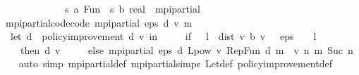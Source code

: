\begin{isabellebody}
\ \ \ \ \ \ \ \ \ \ \ \ {\isasymRightarrow}\ {\isacharparenleft}{\kern0pt}{\isacharprime}{\kern0pt}s{\isacharcomma}{\kern0pt}\ {\isacharprime}{\kern0pt}a{\isacharparenright}{\kern0pt}\ Fun\ {\isasymtimes}\ {\isacharparenleft}{\kern0pt}{\isacharprime}{\kern0pt}s\ {\isasymRightarrow}\isactrlsub b\ real{\isacharparenright}{\kern0pt}{\isachardoublequoteclose}\ \ mpi{\isacharunderscore}{\kern0pt}partial%
\isadelimproof
%
\endisadelimproof
%
\isatagproof
\isacommand{{\isachardot}{\kern0pt}}\isamarkupfalse%
%
\endisatagproof
{\isafoldproof}%
%
\isadelimproof
%
\endisadelimproof
\isanewline
\isanewline
{}\isamarkupfalse%
\ mpi{\isacharunderscore}{\kern0pt}partial{\isacharprime}{\kern0pt}{\isacharunderscore}{\kern0pt}code{\isacharbrackleft}{\kern0pt}code{\isacharbrackright}{\kern0pt}{\isacharcolon}{\kern0pt}\ {\isachardoublequoteopen}mpi{\isacharunderscore}{\kern0pt}partial{\isacharprime}{\kern0pt}\ eps\ d\ v\ m\ {\isacharequal}{\kern0pt}\isanewline
\ \ {\isacharparenleft}{\kern0pt}let\ d{\isacharprime}{\kern0pt}\ {\isacharequal}{\kern0pt}\ policy{\isacharunderscore}{\kern0pt}improvement{\isacharprime}{\kern0pt}\ d\ v\ in\ {\isacharparenleft}{\kern0pt}\isanewline
\ \ \ \ if\ {}\ {\isacharasterisk}{\kern0pt}\ l\ {\isacharasterisk}{\kern0pt}\ dist\ v\ {\isacharparenleft}{\kern0pt}{\isasymL}\isactrlsub b\ v{\isacharparenright}{\kern0pt}\ {\isacharless}{\kern0pt}\ \ eps\ {\isacharasterisk}{\kern0pt}\ {\isacharparenleft}{\kern0pt}{}\ {\isacharminus}{\kern0pt}\ l{\isacharparenright}{\kern0pt}\isanewline
\ \ \ \ then\ {\isacharparenleft}{\kern0pt}d{\isacharprime}{\kern0pt}{\isacharcomma}{\kern0pt}\ v{\isacharparenright}{\kern0pt}\ \isanewline
\ \ \ \ else\ mpi{\isacharunderscore}{\kern0pt}partial{\isacharprime}{\kern0pt}\ eps\ d{\isacharprime}{\kern0pt}\ {\isacharparenleft}{\kern0pt}L{\isacharunderscore}{\kern0pt}pow\ v\ {\isacharparenleft}{\kern0pt}Rep{\isacharunderscore}{\kern0pt}Fun\ d{\isacharprime}{\kern0pt}{\isacharparenright}{\kern0pt}\ {\isacharparenleft}{\kern0pt}m\ {}\ v{\isacharparenright}{\kern0pt}{\isacharparenright}{\kern0pt}\ {\isacharparenleft}{\kern0pt}{\isasymlambda}n{\isachardot}{\kern0pt}\ m\ {\isacharparenleft}{\kern0pt}Suc\ n{\isacharparenright}{\kern0pt}{\isacharparenright}{\kern0pt}{\isacharparenright}{\kern0pt}{\isacharparenright}{\kern0pt}{\isachardoublequoteclose}\isanewline
%
\isadelimproof
\ \ %
\endisadelimproof
%
\isatagproof
{}\isamarkupfalse%
\ {\isacharparenleft}{\kern0pt}auto\ simp{\isacharcolon}{\kern0pt}\ mpi{\isacharunderscore}{\kern0pt}partial{\isacharprime}{\kern0pt}{\isacharunderscore}{\kern0pt}def\ mpi{\isacharunderscore}{\kern0pt}partial{\isachardot}{\kern0pt}simps\ Let{\isacharunderscore}{\kern0pt}def\ policy{\isacharunderscore}{\kern0pt}improvement{\isacharprime}{\kern0pt}{\isacharunderscore}{\kern0pt}def{\isacharparenright}{\kern0pt}%

\end{isabellebody}
